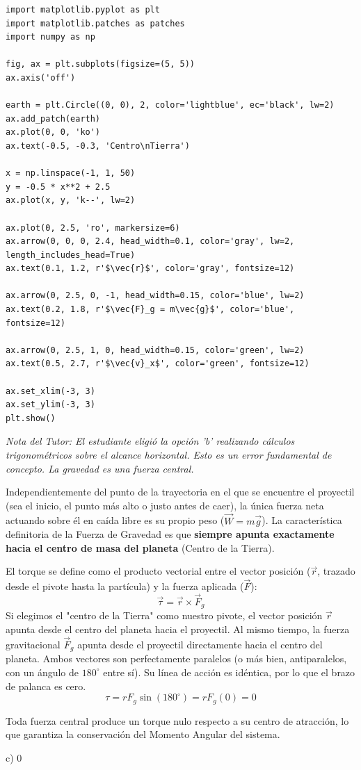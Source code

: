 \documentclass[12pt, a4paper]{article}
\begin{document}
\begin{verbatim}
import matplotlib.pyplot as plt
import matplotlib.patches as patches
import numpy as np

fig, ax = plt.subplots(figsize=(5, 5))
ax.axis('off')

earth = plt.Circle((0, 0), 2, color='lightblue', ec='black', lw=2)
ax.add_patch(earth)
ax.plot(0, 0, 'ko')
ax.text(-0.5, -0.3, 'Centro\nTierra')

x = np.linspace(-1, 1, 50)
y = -0.5 * x**2 + 2.5
ax.plot(x, y, 'k--', lw=2)

ax.plot(0, 2.5, 'ro', markersize=6)
ax.arrow(0, 0, 0, 2.4, head_width=0.1, color='gray', lw=2, length_includes_head=True)
ax.text(0.1, 1.2, r'$\vec{r}$', color='gray', fontsize=12)

ax.arrow(0, 2.5, 0, -1, head_width=0.15, color='blue', lw=2)
ax.text(0.2, 1.8, r'$\vec{F}_g = m\vec{g}$', color='blue', fontsize=12)

ax.arrow(0, 2.5, 1, 0, head_width=0.15, color='green', lw=2)
ax.text(0.5, 2.7, r'$\vec{v}_x$', color='green', fontsize=12)

ax.set_xlim(-3, 3)
ax.set_ylim(-3, 3)
plt.show()
\end{verbatim}

\textit{Nota del Tutor: El estudiante eligió la opción 'b' realizando cálculos trigonométricos sobre el alcance horizontal. Esto es un error fundamental de concepto. La gravedad es una fuerza central.}

Independientemente del punto de la trayectoria en el que se encuentre el proyectil (sea el inicio, el punto más alto o justo antes de caer), la única fuerza neta actuando sobre él en caída libre es su propio peso ($\vec{W} = m\vec{g}$).
La característica definitoria de la Fuerza de Gravedad es que \textbf{siempre apunta exactamente hacia el centro de masa del planeta} (Centro de la Tierra).

El torque se define como el producto vectorial entre el vector posición ($\vec{r}$, trazado desde el pivote hasta la partícula) y la fuerza aplicada ($\vec{F}$):
$$ \vec{\tau} = \vec{r} \times \vec{F}_g $$
Si elegimos el "centro de la Tierra" como nuestro pivote, el vector posición $\vec{r}$ apunta desde el centro del planeta hacia el proyectil. Al mismo tiempo, la fuerza gravitacional $\vec{F}_g$ apunta desde el proyectil directamente hacia el centro del planeta.
Ambos vectores son perfectamente paralelos (o más bien, antiparalelos, con un ángulo de $180^\circ$ entre sí). Su línea de acción es idéntica, por lo que el brazo de palanca es cero.
$$ \tau = r F_g \sin(180^\circ) = r F_g (0) = 0 $$

Toda fuerza central produce un torque nulo respecto a su centro de atracción, lo que garantiza la conservación del Momento Angular del sistema.

\begin{tcolorbox}[colback=green!5!white, colframe=green!50!black, title=Respuesta Final]
\centering \Large c) $0$
\end{tcolorbox}
\end{document}
